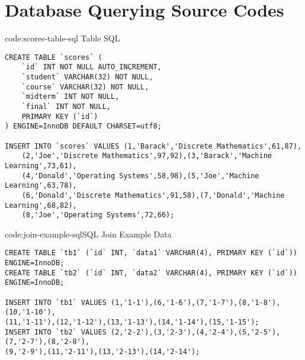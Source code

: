 \section{Database Querying Source Codes}\label{sect:database-querying-codes}

\begin{codeenv}{code:scores-table-sql}{ Table SQL}\begin{verbatim}
CREATE TABLE `scores` (
    `id` INT NOT NULL AUTO_INCREMENT,
    `student` VARCHAR(32) NOT NULL,
    `course` VARCHAR(32) NOT NULL,
    `midterm` INT NOT NULL,
    `final` INT NOT NULL,
    PRIMARY KEY (`id`)
) ENGINE=InnoDB DEFAULT CHARSET=utf8;

INSERT INTO `scores` VALUES (1,'Barack','Discrete Mathematics',61,87),
    (2,'Joe','Discrete Mathematics',97,92),(3,'Barack','Machine Learning',73,61),
    (4,'Donald','Operating Systems',58,98),(5,'Joe','Machine Learning',63,78),
    (6,'Donald','Discrete Mathematics',91,58),(7,'Donald','Machine Learning',68,82),
    (8,'Joe','Operating Systems',72,66);
\end{verbatim}
\end{codeenv}

\begin{codeenv}{code:join-example-sql}{SQL Join Example Data}\begin{verbatim}
CREATE TABLE `tb1` (`id` INT, `data1` VARCHAR(4), PRIMARY KEY (`id`)) ENGINE=InnoDB;
CREATE TABLE `tb2` (`id` INT, `data2` VARCHAR(4), PRIMARY KEY (`id`)) ENGINE=InnoDB;

INSERT INTO `tb1` VALUES (1,'1-1'),(6,'1-6'),(7,'1-7'),(8,'1-8'),(10,'1-10'),
(11,'1-11'),(12,'1-12'),(13,'1-13'),(14,'1-14'),(15,'1-15');
INSERT INTO `tb2` VALUES (2,'2-2'),(3,'2-3'),(4,'2-4'),(5,'2-5'),(7,'2-7'),(8,'2-8'),
(9,'2-9'),(11,'2-11'),(13,'2-13'),(14,'2-14');
\end{verbatim}
\end{codeenv}

